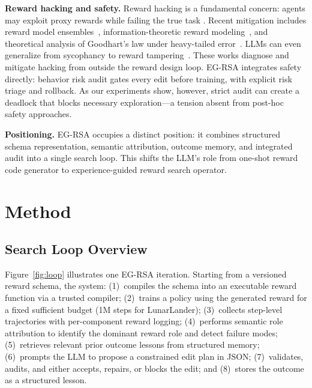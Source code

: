 \documentclass[11pt]{article}
\begin{document}
\textbf{Reward hacking and safety.} Reward hacking is a fundamental concern: agents may exploit proxy rewards while failing the true task \citep{amodei2016concrete,pan2022effects,skalse2022reward}. Recent mitigation includes reward model ensembles~\citep{eisenstein2023ensembles}, information-theoretic reward modeling~\citep{lai2024infom}, and theoretical analysis of Goodhart's law under heavy-tailed error~\citep{langosco2024goodhart}. LLMs can even generalize from sycophancy to reward tampering~\citep{dennison2024sycophancy}. These works diagnose and mitigate hacking from outside the reward design loop. EG-RSA integrates safety directly: behavior risk audit gates every edit before training, with explicit risk triage and rollback. As our experiments show, however, strict audit can create a deadlock that blocks necessary exploration---a tension absent from post-hoc safety approaches.

\textbf{Positioning.} EG-RSA occupies a distinct position: it combines structured schema representation, semantic attribution, outcome memory, and integrated audit into a single search loop. This shifts the LLM's role from one-shot reward code generator to experience-guided reward search operator.

\section{Method}
\label{sec:method}

\subsection{Search Loop Overview}

Figure~\ref{fig:loop} illustrates one EG-RSA iteration. Starting from a versioned reward schema, the system: (1)~compiles the schema into an executable reward function via a trusted compiler; (2)~trains a policy using the generated reward for a fixed sufficient budget (1M steps for LunarLander); (3)~collects step-level trajectories with per-component reward logging; (4)~performs semantic role attribution to identify the dominant reward role and detect failure modes; (5)~retrieves relevant prior outcome lessons from structured memory; (6)~prompts the LLM to propose a constrained edit plan in JSON; (7)~validates, audits, and either accepts, repairs, or blocks the edit; and (8)~stores the outcome as a structured lesson.
\end{document}
